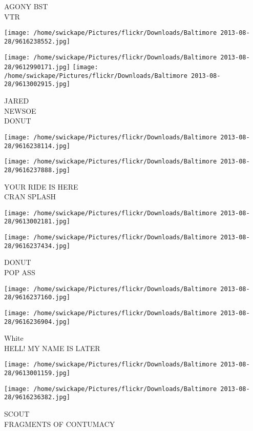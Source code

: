 \documentclass[10pt,letterpaper]{article}
\begin{document}
AGONY BST\\
VTR
\pagebreak

\texttt{[image: /home/swickape/Pictures/flickr/Downloads/Baltimore 2013-08-28/9616238552.jpg]}

\vspace{0.25in}
\texttt{[image: /home/swickape/Pictures/flickr/Downloads/Baltimore 2013-08-28/9612990171.jpg]}
\texttt{[image: /home/swickape/Pictures/flickr/Downloads/Baltimore 2013-08-28/9613002915.jpg]}

JARED\\
NEWSOE\\
DONUT
\pagebreak

\texttt{[image: /home/swickape/Pictures/flickr/Downloads/Baltimore 2013-08-28/9616238114.jpg]}

\vspace{0.25in}
\texttt{[image: /home/swickape/Pictures/flickr/Downloads/Baltimore 2013-08-28/9616237888.jpg]}

YOUR RIDE IS HERE\\
CRAN SPLASH
\pagebreak

\texttt{[image: /home/swickape/Pictures/flickr/Downloads/Baltimore 2013-08-28/9613002181.jpg]}

\vspace{0.25in}
\texttt{[image: /home/swickape/Pictures/flickr/Downloads/Baltimore 2013-08-28/9616237434.jpg]}

DONUT\\
POP ASS
\pagebreak

\texttt{[image: /home/swickape/Pictures/flickr/Downloads/Baltimore 2013-08-28/9616237160.jpg]}

\vspace{0.25in}
\texttt{[image: /home/swickape/Pictures/flickr/Downloads/Baltimore 2013-08-28/9616236904.jpg]}

White\\
HELL! MY NAME IS LATER
\pagebreak

\texttt{[image: /home/swickape/Pictures/flickr/Downloads/Baltimore 2013-08-28/9613001159.jpg]}

\vspace{0.25in}
\texttt{[image: /home/swickape/Pictures/flickr/Downloads/Baltimore 2013-08-28/9616236382.jpg]}

SCOUT\\
FRAGMENTS OF CONTUMACY
\pagebreak
\end{document}
